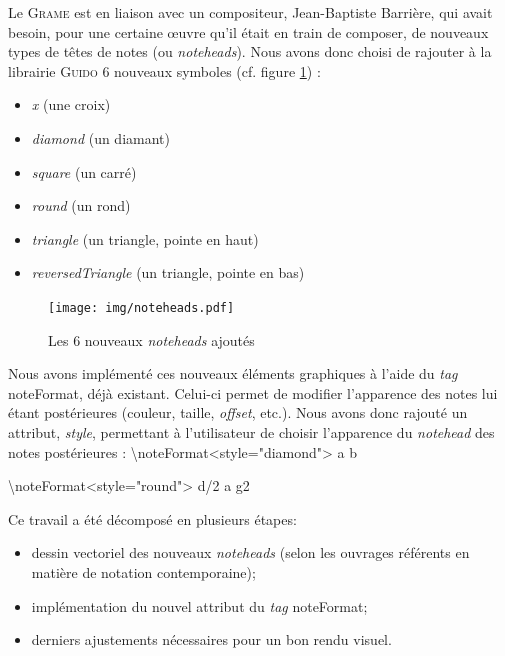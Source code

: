 \documentclass{article}
\newenvironment{code}
  {\fontfamily{pnc}\selectfont}{}
\begin{document}
Le \textsc{Grame} est en liaison avec un compositeur, Jean-Baptiste Barrière, qui avait besoin, pour une certaine œuvre qu'il était en train de composer, de nouveaux types de têtes de notes (ou \emph{noteheads}).
Nous avons donc choisi de rajouter à la librairie \textsc{Guido} 6 nouveaux symboles (cf. figure \ref{fig:noteheads}) :
%
\begin{itemize}
    \item \emph{x} (une croix)
    \item \emph{diamond} (un diamant)
    \item \emph{square} (un carré)
    \item \emph{round} (un rond)
    \item \emph{triangle} (un triangle, pointe en haut)
    \item \emph{reversedTriangle} (un triangle, pointe en bas)
\end{itemize} 
%
\begin{figure}[h]
\centering
\texttt{[image: img/noteheads.pdf]}
\caption{Les 6 nouveaux \emph{noteheads} ajoutés}
\label{fig:noteheads}
\end{figure}
%
Nous avons implémenté ces nouveaux éléments graphiques à l'aide du \emph{tag} \begin{code}noteFormat\end{code}, déjà existant. Celui-ci permet de modifier l'apparence des notes lui étant postérieures (couleur, taille, \emph{offset}, etc.). Nous avons donc rajouté un attribut, \emph{style}, permettant à l'utilisateur de choisir l'apparence du \emph{notehead} des notes postérieures :
%
\begin{code}
\textbackslash{}noteFormat\textless{}style="diamond"\textgreater{} a b

\textbackslash{}noteFormat\textless{}style="round"\textgreater{} d/2 a g2
\end{code}

Ce travail a été décomposé en plusieurs étapes:
\begin{itemize}
    \item dessin vectoriel des nouveaux \emph{noteheads} (selon les ouvrages référents en matière de notation contemporaine);
    \item implémentation du nouvel attribut du \emph{tag} \begin{code}noteFormat\end{code};
    \item derniers ajustements nécessaires pour un bon rendu visuel.
\end{itemize}
\end{document}
